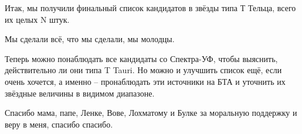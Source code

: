 Итак, мы получили финальный список кандидатов в звёзды типа Т Тельца, всего их целых N штук.

Мы сделали всё, что мы сделали, мы молодцы. 

Теперь можно понаблюдать все кандидаты со Спектра-УФ, чтобы выяснить, действительно ли они типа T Tauri. Но можно и улучшить список ещё, если очень хочется, а именно -- пронаблюдать эти источники на БТА и уточнить их звёздные величины в видимом диапазоне.

Спасибо мама, папе, Ленке, Вове, Лохматому и Булке за моральную поддержку и веру в меня, спасибо спасибо.



